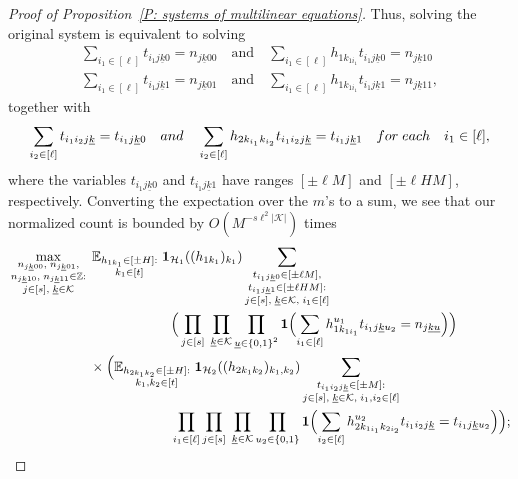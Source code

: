 \documentclass[10pt,a4paper]{amsart}
\newcommand{\Bigbrac}[1]{\Bigl( #1 \Bigr)}
\newcommand{\CH}{{\mathcal H}}
\newcommand{\CK}{{\mathcal K}}
\newcommand{\E}{{\mathbb E}}
\newcommand{\Z}{{\mathbb Z}}
\newcommand{\uk}{{\underline{k}}}
\newcommand{\uu}{{\underline{u}}}
\begin{document}
\begin{proof}[Proof of Proposition~\ref{P: systems of multilinear equations}]
Thus, solving the original system is equivalent to solving
\begin{align*}
    \sum_{i_1\in[\ell]} t_{i_1 j \uk 0} = n_{j\uk00}\quad \textrm{and}\quad
    \sum_{i_1\in[\ell]} h_{1k_{1i_1}} t_{i_1 j \uk 0} = n_{j\uk10}\\
    \sum_{i_1\in[\ell]} t_{i_1 j \uk 1} = n_{j\uk01} \quad \textrm{and}\quad
    \sum_{i_1\in[\ell]} h_{1k_{1i_1}} t_{i_1 j \uk 1} = n_{j\uk11},
\end{align*}
together with
\begin{align*}
    \sum_{i_2\in[\ell]}t_{i_1 i_2 j\uk} = t_{i_1 j \uk 0} \quad \textrm{and}\quad
    \sum_{i_2\in[\ell]}h_{2k_{i_1}k_{i_2}}t_{i_1 i_2 j\uk} = t_{i_1 j \uk 1}\quad \textrm{for\; each}\quad i_1\in[\ell],
\end{align*}
where the variables $t_{i_1 j \uk 0}$ and $t_{i_1 j \uk 1}$ have ranges $[\pm \ell M]$ and $[\pm\ell H M]$, respectively.  Converting the expectation over the $m$'s to a sum, we see that our normalized count is bounded by $O(M^{-s \ell^2|\CK|})$ times 
        \begin{align*}
        &\max_{\substack{n_{j\uk00},\; n_{j\uk01},\\ n_{j\uk10},\; n_{j\uk11}\in\Z:\\ j\in[s],\; \uk\in\CK}}\;
                \E_{\substack{h_{1k_1}\in[\pm H]:\\  k_1\in[t]}}\; \mathbf{1}_{\CH_1}((h_{1k_1})_{k_1}) \sum_{\substack{t_{i_1 j\uk 0}\in[\pm\ell M],\\ t_{i_1 j\uk 1}\in[\pm \ell H M]:\\ j\in[s],\; \uk\in\CK,\; i_1\in[\ell]}}\\
        &\qquad\qquad\qquad\qquad\qquad\qquad\Big(\prod_{j\in[s]}\; \prod_{\substack{\uk\in\CK}}\prod_{\substack{\uu\in\{0,1\}^2}} \mathbf{1}\Bigbrac{\sum\limits_{i_1\in[\ell]} h_{1k_{1i_1}}^{u_1} t_{i_1 j\uk u_2} = n_{j\uk\uu}}\Big)\\
        &\qquad\qquad\qquad\times \Big(\E_{\substack{h_{2k_1k_2}\in[\pm H]:\\  k_1, k_2\in[t]}}\; \mathbf{1}_{\CH_2}((h_{2k_1k_2})_{k_1, k_2})
        \sum_{\substack{t_{i_1 i_2 j\uk}\in[\pm M]:\\ j\in[s],\; \uk\in\CK,\; i_1, i_2\in[\ell]}}\\
        &\qquad\qquad\qquad\qquad\qquad\qquad\prod_{i_1\in[\ell]}\prod_{j\in[s]}\; \prod_{\substack{\uk\in\CK}}\prod_{\substack{u_2\in\{0,1\}}} \mathbf{1}\Bigbrac{\sum\limits_{i_2\in[\ell]} h_{2k_{1i_1}k_{2i_2}}^{u_2} t_{i_1 i_2 j\uk} = t_{i_1 j\uk u_2}}\Big);

\end{align*}
\end{proof}
\end{document}
